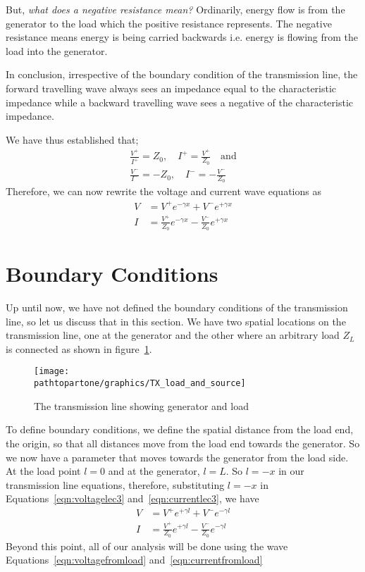 But, \emph{what does a negative resistance mean?} Ordinarily, energy flow is from the generator to the load which the positive resistance represents. The negative resistance means energy is being carried backwards i.e. energy is flowing from the load into the generator.

In conclusion, irrespective of the boundary condition of the transmission line, the forward travelling wave always sees an impedance equal to the characteristic impedance while a backward travelling wave sees a negative of the characteristic impedance.

We have thus established that;
\begin{align*}
\frac{V^+}{I^+} = Z_0,\quad I^+ = \frac{V^+}{Z_0}\quad\text{and}\\
\frac{V^-}{I^-} = -Z_0,\quad I^- = -\frac{V^-}{Z_0}
\end{align*}
Therefore, we can now rewrite the voltage and current wave equations as
\begin{align}
V &= V^+e^{-\gamma x}+V^-e^{+\gamma x}
\label{eqn:voltagelec3}\\
I &= \frac{V^+}{Z_0}e^{-\gamma x}-\frac{V^-}{Z_0}e^{+\gamma x}
\label{eqn:currentlec3}
\end{align}

\section{Boundary Conditions}
Up until now, we have not defined the boundary conditions of the transmission line, so let us discuss that in this section. We have two spatial locations on the transmission line, one at the generator and the other where an arbitrary load $Z_L$ is connected as shown in figure~\ref{fig:tlcircuit}.
\begin{figure}[h]
\centering
\texttt{[image: \\pathtopartone/graphics/TX\_load\_and\_source]}
\caption{The transmission line showing generator and load}
\label{fig:tlcircuit}
\end{figure}

To define boundary conditions, we define the spatial distance from the load end, the origin, so that all distances move from the load end towards the generator. So we now have a parameter that moves towards the generator from the load side. At the load point $l = 0$ and at the generator, $l = L$. So $l = -x$ in our transmission line equations, therefore, substituting $l = -x$ in Equations~\ref{eqn:voltagelec3} and~\ref{eqn:currentlec3}, we have
\begin{align}
V &= V^+e^{+\gamma l}+V^-e^{-\gamma l}
\label{eqn:voltagefromload}\\
I &= \frac{V^+}{Z_0}e^{+\gamma l}-\frac{V^-}{Z_0}e^{-\gamma l}
\label{eqn:currentfromload}
\end{align}
Beyond this point, all of our analysis will be done using the wave Equations~\eqref{eqn:voltagefromload} and~\eqref{eqn:currentfromload}

